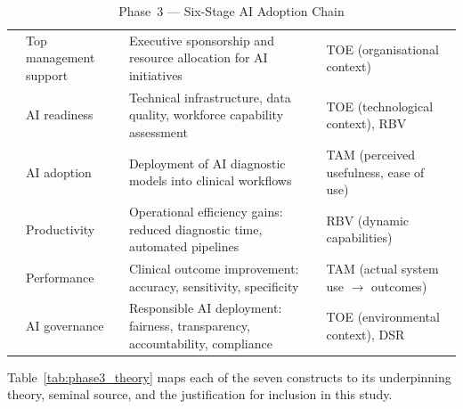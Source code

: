 \begingroup\singlespacing\tablefontsize\tablestripes
\begin{xltabular}{\textwidth}{@{} c p{0.15\textwidth} X X @{}}
\caption{Phase~3 --- Six-Stage AI Adoption Chain}
\label{tab:phase3_adoption}\\
\toprule
{} &  &  &  \\
\midrule
\endfirsthead
\endhead
\bottomrule
{} & Top management support     & Executive sponsorship and resource allocation for AI initiatives            & TOE (organisational context) \\
 & AI readiness               & Technical infrastructure, data quality, workforce capability assessment     & TOE (technological context), RBV \\
 & AI adoption                & Deployment of AI diagnostic models into clinical workflows                  & TAM (perceived usefulness, ease of use) \\
 & Productivity               & Operational efficiency gains: reduced diagnostic time, automated pipelines  & RBV (dynamic capabilities) \\
 & Performance                & Clinical outcome improvement: accuracy, sensitivity, specificity           & TAM (actual system use $\rightarrow$ outcomes) \\
 & AI governance              & Responsible AI deployment: fairness, transparency, accountability, compliance & TOE (environmental context), DSR \\
\end{xltabular}
\endgroup

\vspace{1.5em}

Table~\ref{tab:phase3_theory} maps each of the seven constructs to its underpinning theory, seminal source, and the justification for inclusion in this study.

